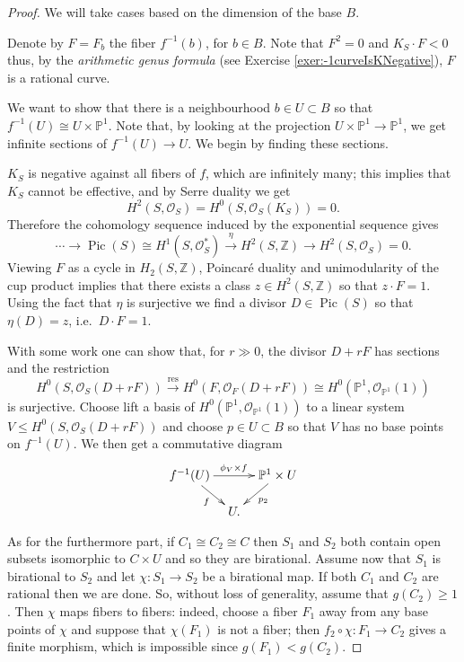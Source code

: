 \documentclass[a4paper,11pt]{amsart}
\def\dim{\operatorname{dim}}
\def\Pic{\operatorname{Pic}}
\newcommand{\OO}{\mathcal{O}}
\newcommand{\ZZ}{\mathbb{Z}}
\newcommand{\PP}{\mathbb{P}}
\newcommand{\isom}{\cong}
\begin{document}
\begin{proof}
	We will take cases based on the dimension of the base $B$.
	
	\noindent\fbox{Case: $\dim(B) = 1$}\label{case:dimB1}
	
	Denote by $F = F_b$ the fiber $f^{-1}(b)$, for $b\in B$.
	Note that $F^2= 0$ and $K_S\cdot F < 0$ thus, by the \emph{arithmetic genus formula} (see Exercise \ref{exer:-1curveIsKNegative}), $F$ is a rational curve.
	
	We want to show that there is a neighbourhood $b\in U \subset B$ so that $f^{-1}(U) \isom U\times \PP^1$.
	Note that, by looking at the projection $U\times \PP^1 \to \PP^1$, we get infinite sections of $f^{-1}(U) \to U$.
	We begin by finding these sections.	
	
	$K_S$ is negative against all fibers of $f$, which are infinitely many;
	this implies that $K_S$ cannot be effective, and by Serre duality we get
	\[
	H^2(S,\OO_S) = H^0(S,\OO_S(K_S)) = 0.
	\]
	Therefore the cohomology sequence induced by the exponential sequence gives
	\[
	\cdots \to \Pic(S) \isom H^1(S,\OO_S^*) \overset{\eta}{\longrightarrow} H^2(S,\ZZ) \to H^2(S,\OO_S) = 0.
	\]
	Viewing $F$ as a cycle in $H_2(S,\ZZ)$, Poincar{\'e} duality and unimodularity of the cup product implies that there exists a class $z \in H^2(S,\ZZ)$ so that $z \cdot F = 1$.
	Using the fact that $\eta$ is surjective we find a divisor $D \in \Pic(S)$ so that $\eta(D) = z$, i.e.\ $D \cdot F = 1$.
	
	With some work one can show that, for $r \gg 0$, the divisor $D+rF$ has sections and the restriction
	\[
	H^0(S,\OO_S(D+rF)) \overset{\text{res}}{\longrightarrow} H^0(F,\OO_F(D+rF)) \isom H^0(\PP^1,\OO_{\PP^1}(1))
	\]
	is surjective.
	Choose lift a basis of $H^0(\PP^1,\OO_{\PP^1}(1))$ to a linear system $V \leq H^0(S,\OO_S(D+rF))$ and choose $p\in U\subset B$ so that $V$ has no base points on $f^{-1}(U)$.
	We then get a commutative diagram
	\[
	\xymatrix@R=.5cm@C=.3cm{
	f^{-1}(U) \ar[rr]^{\phi_{V}\times f} \ar[dr]_f && \PP^1 \times U \ar[ld]^{p_2}\\
	&U.
	}
	\]
	
	As for the furthermore part, if $C_1 \isom C_2 \isom C$ then $S_1$ and $S_2$ both contain open subsets isomorphic to $C \times U$ and so they are birational.
	Assume now that $S_1$ is birational to $S_2$ and let $\chi \colon S_1 \to S_2$ be a birational map.
	If both $C_1$ and $C_2$ are rational then we are done.
	So, without loss of generality, assume that $g(C_2) \geq 1$.
	Then $\chi$ maps fibers to fibers:
	indeed, choose a fiber $F_1$ away from any base points of $\chi$ and suppose that $\chi(F_1)$ is not a fiber;
	then $f_2\circ \chi\colon F_1 \to C_2$ gives a finite morphism, which is impossible since $g(F_1) < g(C_2)$.
	

\end{proof}
\end{document}
